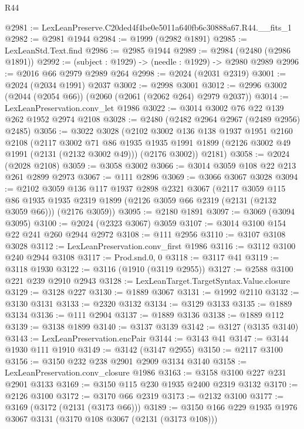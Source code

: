 \begin{lexlean}{R44}
\begin{coremodule}
@2981 := LexLeanPreserve.C20ded4f4be0e5011a640fb6c30888a67.R44.__fits_1
@2982 := @2981 @1944
@2984 := @1999 (@2982 @1891)
@2985 := LexLeanStd.Text.find
@2986 := @2985 @1944
@2989 := @2984 (@2480 (@2986 @1891))
@2992 := (subject : @1929) -> (needle : @1929) -> @2980 @2989
@2996 := @2016 @66 @2979 @2989 @264
@2998 := @2024 (@2031 @2319)
@3001 := @2024 (@2034 @1991) @2037
@3002 := @2998 @3001
@3012 := @2996 @3002 (@2044 (@2054 @66)) (@2060 (@2061 (@2062 @264) @2979 @2037))
@3014 := LexLeanPreservation.conv_let @1986
@3022 := @3014 @3002 @76 @22 @139 @262 @1952 @2974 @2108
@3028 := @2480 (@2482 @2964 @2967 (@2489 @2956) @2485)
@3056 := @3022
    @3028
    (@2102
      @3002
      @136
      @138
      @1937
      @1951
      @2160
      @2108
      (@2117
        @3002
        @71
        @86
        @1935
        @1935
        @1991
        @1899
        (@2126 @3002 @49 @1991 (@2131 (@2132 @3002 @49)))
        (@2176 @3002))
      @2181)
@3058 := @2024 (@2028 @2108)
@3059 := @3058 @3002
@3066 := @3014 @3059 @108 @22 @213 @261 @2899 @2973
@3067 := @111 @2896
@3069 := @3066 @3067 @3028
@3094 := @2102
    @3059
    @136
    @117
    @1937
    @2898
    @2321
    @3067
    (@2117
      @3059
      @115
      @86
      @1935
      @1935
      @2319
      @1899
      (@2126 @3059 @66 @2319 (@2131 (@2132 @3059 @66)))
      (@2176 @3059))
@3095 := @2180 @1891
@3097 := @3069 (@3094 @3095)
@3100 := @2024 (@2323 @3067) @3059
@3107 := @3014 @3100 @154 @22 @241 @260 @2944 @2972
@3108 := @111 @2956
@3110 := @3107 @3108 @3028
@3112 := LexLeanPreservation.conv_first @1986
@3116 := @3112 @3100 @240 @2944 @3108
@3117 := Prod.snd.{0, 0}
@3118 := @3117 @41
@3119 := @3118 @1930
@3122 := @3116 (@1910 (@3119 @2955))
@3127 := @2588 @3100 @221 @239 @2910 @2943
@3128 := LexLeanTarget.TargetSyntax.Value.closure
@3129 := @3128 @227
@3130 := @1889 @3067
@3131 := @1992 @2110
@3132 := @3130 @3131
@3133 := @2320 @3132
@3134 := @3129 @3133
@3135 := @1889 @3134
@3136 := @111 @2904
@3137 := @1889 @3136
@3138 := @1889 @112
@3139 := @3138 @1899
@3140 := @3137 @3139
@3142 := @3127 (@3135 @3140)
@3143 := LexLeanPreservation.encPair
@3144 := @3143 @41
@3147 := @3144 @1930 @111 @1910
@3149 := @3142 (@3147 @2955)
@3150 := @2117 @3100
@3156 := @3150 @232 @238 @2901 @2909 @3134 @3140
@3158 := LexLeanPreservation.conv_closure @1986
@3163 := @3158 @3100 @227 @231 @2901 @3133
@3169 := @3150 @115 @230 @1935 @2400 @2319 @3132
@3170 := @2126 @3100
@3172 := @3170 @66 @2319
@3173 := @2132 @3100
@3177 := @3169 (@3172 (@2131 (@3173 @66)))
@3189 := @3150 @166 @229 @1935 @1976 @3067 @3131 (@3170 @108 @3067 (@2131 (@3173 @108)))

\end{coremodule}
\end{lexlean}
